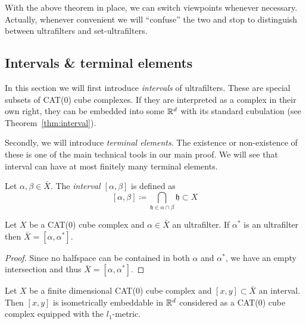 \begin{rem}
  With the above theorem in place, we can switch viewpoints whenever necessary. Actually, whenever convenient we will \enquote{confuse} the two and stop to distinguish between ultrafilters and set-ultrafilters.
\end{rem}

\subsection{Intervals \& terminal elements}
\label{sec:terminal-elements}

In this section we will first introduce \emph{intervals} of ultrafilters. These are special subsets of CAT(0) cube complexes. If they are interpreted as a complex in their own right, they can be embedded into some \(\mathbb{R}^d\) with its standard cubulation (see Theorem~\ref{thm:interval}).

Secondly, we will introduce \emph{terminal elements}. The existence or non-existence of these is one of the main technical tools in our main proof. We will see that interval can have at most finitely many terminal elements.

\begin{defin}
  \label{defin:uf-interval}
  Let \(\alpha,\beta \in \bar X\). The \emph{interval \([\alpha,\beta]\)} is defined as
  \[
    [\alpha,\beta] \coloneqq \bigcap_{\mathfrak{h} \in \alpha \cap \beta} \mathfrak{h} \subset X
  \]
\end{defin}

\begin{lemma}
  \label{lem:x-interval}
  Let \(X\) be a CAT(0) cube complex and \(\alpha \in \bar X\) an ultrafilter. If \(\alpha^\ast\) is an ultrafilter then \(\bar X = [\alpha, \alpha^\ast]\).
\end{lemma}

\begin{proof}
  Since no halfspace can be contained in both \(\alpha\) and \(\alpha^\ast\), we have an empty intersection and thus \(\bar X = [\alpha, \alpha^\ast]\).
\end{proof}

\begin{thm}
  \label{thm:interval}
  Let \(X\) be a finite dimensional CAT(0) cube complex and \([x,y] \subset \bar X\) an interval. Then \([x,y]\) is isometrically embeddable in \(\mathbb{R}^d\) considered as a CAT(0) cube complex equipped with the \(l_1\)-metric.
\end{thm}

